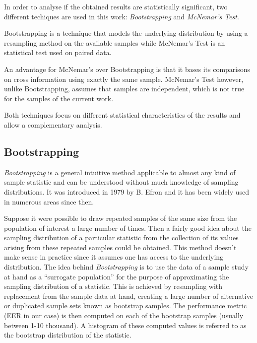 In order to analyse if the obtained results are statistically significant,
two different techiques are used in this work: \textit{Bootstrapping} and
\textit{McNemar's Test}.

Bootstrapping is a technique that models the underlying
distribution by using a resampling method on the available samples while McNemar's
Test is an statistical test used on paired data.

An advantage for McNemar's
over Bootstrapping is that it bases its comparisons on cross information using
exactly the same sample. McNemar's Test however, unlike Bootstrapping, assumes that samples
are independent, which is not true for the samples of the current work.

Both techniques focus on different statistical characteristics of the results and allow a
complementary analysis.

\subsection{Bootstrapping}

\textit{Bootstrapping} \cite{bootstrapping} is a general intuitive method applicable
to almost any kind of sample statistic and can be understood without much
knowledge of sampling distributions. It was introduced in 1979 by B. Efron and it has
been widely used in numerous areas since then.

Suppose it were possible to draw repeated samples
of the same size from the population of interest a large number of times. Then
a fairly good idea about the sampling distribution of a particular statistic from
the collection of its values arising from these repeated samples could be obtained.
This method doesn't make sense in practice since it assumes one has access to the
underlying distribution.
The idea behind \textit{Bootstrapping} is to use the data of a sample study at hand as a
``surrogate population'' for the purpose of approximating the sampling distribution of
a statistic. This is achieved by resampling with replacement from the sample data
at hand, creating a large number of alternative or duplicated sample sets known as
bootstrap samples. The performance metric (EER in our case)
is then computed on each of the bootstrap
samples (usually between 1-10 thousand). A histogram of these computed
values is referred to as the bootstrap distribution of the statistic.

